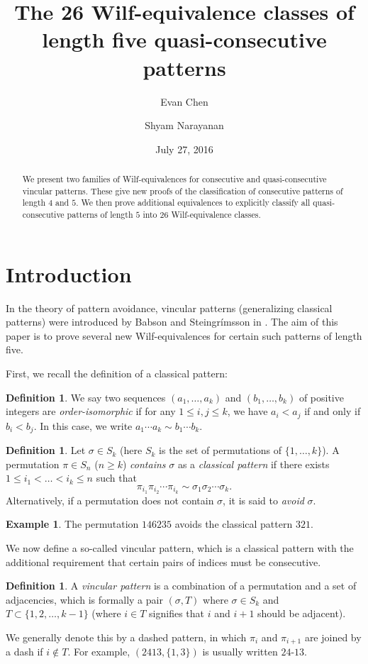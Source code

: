 \documentclass[11pt]{amsart}
\title[Length five quasi-consecutive patterns]{The 26 Wilf-equivalence classes of length five quasi-consecutive patterns}
\author{Evan Chen}
\author{Shyam Narayanan}
\date{July 27, 2016}
\theoremstyle{definition}
\newtheorem{definition}[theorem]{Definition}
\newtheorem{example}[theorem]{Example}
\begin{document}
\maketitle

\begin{abstract}
	We present two families of Wilf-equivalences
	for consecutive and quasi-consecutive vincular patterns.
	These give new proofs of the classification of consecutive
	patterns of length $4$ and $5$.
	We then prove additional equivalences to explicitly classify all
	quasi-consecutive patterns of length $5$ into 26 Wilf-equivalence classes.
\end{abstract}

\section{Introduction}
In the theory of pattern avoidance,
vincular patterns (generalizing classical patterns)
were introduced by Babson and Steingr\'imsson in \cite{Babson2000}.
The aim of this paper is to prove several new Wilf-equivalences
for certain such patterns of length five.

First, we recall the definition of a classical pattern:
\begin{definition}
	We say two sequences $(a_1, \dots, a_k)$ and $(b_1, \dots, b_k)$
	of positive integers are \emph{order-isomorphic} if
	for any $1 \le i,j \le k$, we have $a_i < a_j$ if and only if $b_i < b_j$.
	In this case, we write $a_1 \cdots a_k \sim b_1 \cdots b_k$.
\end{definition}
\begin{definition}
	Let $\sigma \in S_k$
	(here $S_k$ is the set of permutations of $\{1, \dots, k\}$).
	A permutation $\pi \in S_n$ ($n \ge k$) \emph{contains} $\sigma$ as a \emph{classical pattern}
	if there exists $1 \le i_1 < \dots < i_k \le n$ such that 
	\[ \pi_{i_1} \pi_{i_2} \cdots \pi_{i_k} \sim \sigma_1\sigma_2\cdots\sigma_k. \]
	Alternatively, if a permutation does not contain $\sigma$,
	it is said to \emph{avoid} $\sigma$.
\end{definition}
\begin{example}
	The permutation $146235$ avoids the classical pattern $321$.
\end{example}

We now define a so-called vincular pattern,
which is a classical pattern with the additional requirement
that certain pairs of indices must be consecutive.
\begin{definition}
	A \emph{vincular pattern} is a combination of a
	permutation and a set of adjacencies,
	which is formally a pair $(\sigma, T)$
	where $\sigma \in S_k$ and $T \subset \{1, 2, \dots, k-1\}$
	(where $i \in T$ signifies that $i$ and $i+1$ should be adjacent).
	
    We generally denote this by a dashed pattern,
	in which $\pi_i$ and $\pi_{i+1}$ are joined by a dash if $i \notin T$.
	For example, $(2413, \{1,3\})$ is usually written $24{\text{-}}13$.
\end{definition}
\end{document}
